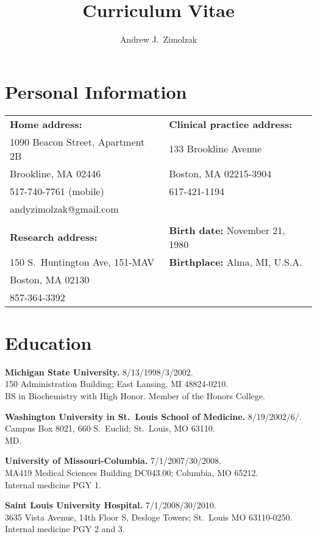 \documentclass[12pt]{article}
\title{Curriculum Vitae}
\author{Andrew J.\ Zimolzak}
\begin{document}
\thispagestyle{fancy}

\section*{Personal Information}

\begin{tabular}{l l}
\textbf{Home address:}           & \textbf{Clinical practice address:}\\
1090 Beacon Street, Apartment 2B & 133 Brookline Avenue\\
Brookline, MA 02446              & Boston, MA 02215-3904\\
517-740-7761 (mobile)            & 617-421-1194\\
andyzimolzak@gmail.com           \\
\\
\textbf{Research address:}       & \textbf{Birth date:} November 21, 1980\\
150 S.\ Huntington Ave, 151-MAV  & \textbf{Birthplace:} Alma, MI, U.S.A.\\
Boston, MA 02130\\
857-364-3392
\end{tabular}

\section*{Education}

\textbf{Michigan State University.} 8/13/1998/3/2002.\\
150 Administration Building; East Lansing, MI 48824-0210.\\
BS in Biochemistry with High Honor. Member of the Honors College.

\textbf{Washington University in St.\ Louis School of Medicine.}
8/19/2002\ndash{}/6/.\\
Campus Box 8021, 660 S.\ Euclid; St.\ Louis, MO 63110.\\
MD.

\textbf{University of Missouri-Columbia.} 7/1/2007/30/2008.\\
MA419 Medical Sciences Building DC043.00; Columbia, MO 65212.\\
Internal medicine PGY 1.

\textbf{Saint Louis University Hospital.} 7/1/2008/30/2010.\\
3635 Vista Avenue, 14th Floor S, Desloge Towers; St.\ Louis MO
63110-0250.\\
Internal medicine PGY 2 and 3.
\end{document}
